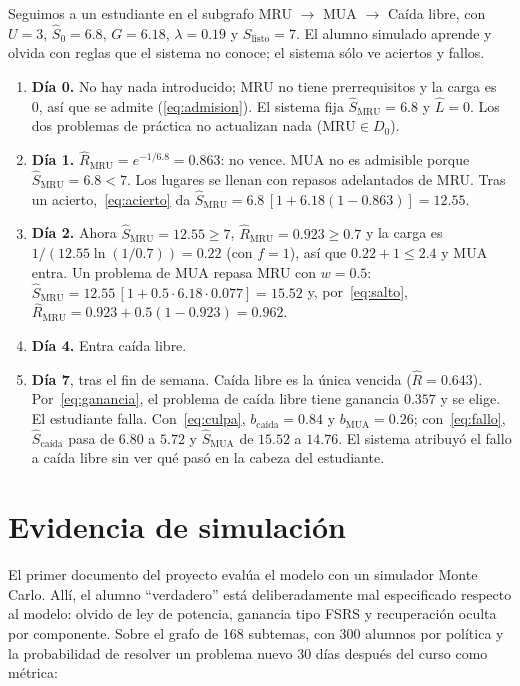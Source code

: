 \documentclass[11pt]{article}
\theoremstyle{definition}
\theoremstyle{remark}
\newcommand{\Rh}{\hat R}
\newcommand{\Sh}{\hat S}
\newcommand{\Lh}{\hat L}
\newcommand{\Slisto}{S_{\mathrm{listo}}}
\begin{document}
Seguimos a un estudiante en el subgrafo MRU $\to$ MUA $\to$ Caída libre, con $U=3$, $\Sh_0=6.8$, $G=6.18$, $\lambda=0.19$ y $\Slisto=7$. El alumno simulado aprende y olvida con reglas que el sistema no conoce; el sistema sólo ve aciertos y fallos.

\begin{enumerate}
\item \textbf{Día 0.} No hay nada introducido; MRU no tiene prerrequisitos y la carga es 0, así que se admite (\eqref{eq:admision}). El sistema fija $\Sh_{\text{MRU}}=6.8$ y $\Lh=0$. Los dos problemas de práctica no actualizan nada ($\text{MRU}\in D_0$).
\item \textbf{Día 1.} $\Rh_{\text{MRU}}=e^{-1/6.8}=0.863$: no vence. MUA no es admisible porque $\Sh_{\text{MRU}}=6.8<7$. Los lugares se llenan con repasos adelantados de MRU. Tras un acierto,~\eqref{eq:acierto} da $\Sh_{\text{MRU}}=6.8\,[1+6.18(1-0.863)]=12.55$.
\item \textbf{Día 2.} Ahora $\Sh_{\text{MRU}}=12.55\ge7$, $\Rh_{\text{MRU}}=0.923\ge0.7$ y la carga es $1/(12.55\ln(1/0.7))=0.22$ (con $f=1$), así que $0.22+1\le2.4$ y MUA entra. Un problema de MUA repasa MRU con $w=0.5$: $\Sh_{\text{MRU}}=12.55\,[1+0.5\cdot6.18\cdot0.077]=15.52$ y, por~\eqref{eq:salto}, $\Rh_{\text{MRU}}=0.923+0.5(1-0.923)=0.962$.
\item \textbf{Día 4.} Entra caída libre.
\item \textbf{Día 7}, tras el fin de semana. Caída libre es la única vencida ($\Rh=0.643$). Por~\eqref{eq:ganancia}, el problema de caída libre tiene ganancia $0.357$ y se elige. El estudiante falla. Con~\eqref{eq:culpa}, $b_{\text{caída}}=0.84$ y $b_{\text{MUA}}=0.26$; con~\eqref{eq:fallo}, $\Sh_{\text{caída}}$ pasa de $6.80$ a $5.72$ y $\Sh_{\text{MUA}}$ de $15.52$ a $14.76$. El sistema atribuyó el fallo a caída libre sin ver qué pasó en la cabeza del estudiante.
\end{enumerate}

\section{Evidencia de simulación}
\label{sec:evidencia}

El primer documento del proyecto evalúa el modelo con un simulador Monte Carlo. Allí, el alumno ``verdadero'' está deliberadamente mal especificado respecto al modelo: olvido de ley de potencia, ganancia tipo FSRS y recuperación oculta por componente. Sobre el grafo de 168 subtemas, con 300 alumnos por política y la probabilidad de resolver un problema nuevo 30 días después del curso como métrica:
\end{document}
